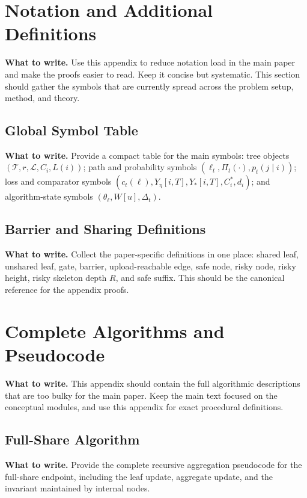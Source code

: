 \documentclass{article}
\newcommand{\towrite}[1]{\noindent\textbf{What to write.} #1}
\begin{document}
\appendix

\section{Notation and Additional Definitions}

\towrite{Use this appendix to reduce notation load in the main paper and make the proofs easier to read. Keep it concise but systematic. This section should gather the symbols that are currently spread across the problem setup, method, and theory.}

\subsection{Global Symbol Table}

\towrite{Provide a compact table for the main symbols: tree objects $(\mathcal{T}, r, \mathcal{L}, C_i, L(i))$; path and probability symbols $(\ell_t, \Pi_t(\cdot), p_t(j \mid i))$; loss and comparator symbols $(c_t(\ell), Y_\eta[i,T], Y_\ast[i,T], C_i^\ast, d_i)$; and algorithm-state symbols $(\theta_\ell, W[u], \Delta_t)$.}

\subsection{Barrier and Sharing Definitions}

\towrite{Collect the paper-specific definitions in one place: shared leaf, unshared leaf, gate, barrier, upload-reachable edge, safe node, risky node, risky height, risky skeleton depth $R$, and safe suffix. This should be the canonical reference for the appendix proofs.}

\section{Complete Algorithms and Pseudocode}

\towrite{This appendix should contain the full algorithmic descriptions that are too bulky for the main paper. Keep the main text focused on the conceptual modules, and use this appendix for exact procedural definitions.}

\subsection{Full-Share Algorithm}

\towrite{Provide the complete recursive aggregation pseudocode for the full-share endpoint, including the leaf update, aggregate update, and the invariant maintained by internal nodes.}
\end{document}
